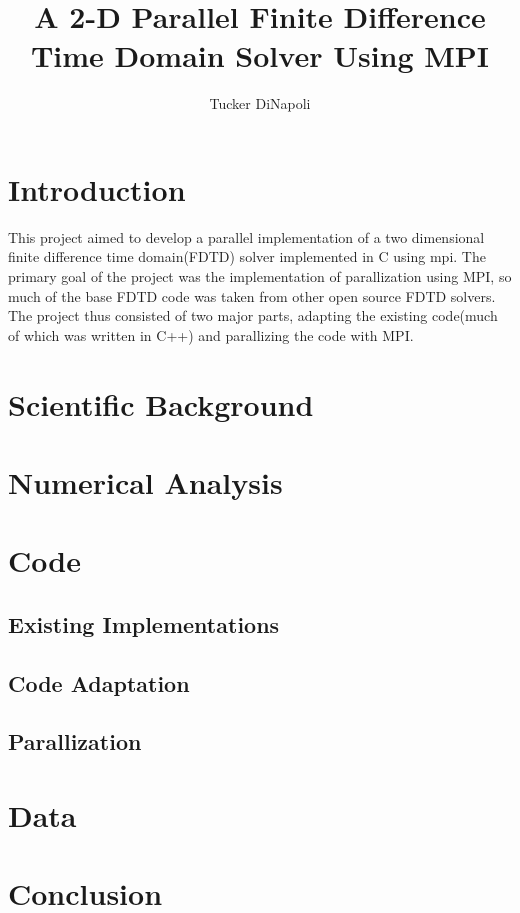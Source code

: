 \documentclass{article}
\author{Tucker DiNapoli}
\title{A 2-D Parallel Finite Difference Time Domain Solver Using MPI}
\begin{document}
\maketitle
\section{Introduction}
This project aimed to develop a parallel implementation of a two
dimensional finite difference time domain(FDTD) solver implemented in C
using mpi. The primary goal of the project was the implementation of
parallization using MPI, so much of the base FDTD code was taken from
other open source FDTD solvers.%
The project thus consisted of two major parts, adapting the existing
code(much of which was written in C++) and parallizing the code with
MPI. 
\section{Scientific Background}
\section{Numerical Analysis}
\section{Code}%
\subsection{Existing Implementations}
\subsection{Code Adaptation}
\subsection{Parallization}
\section{Data}
\section{Conclusion}


\end{document}
